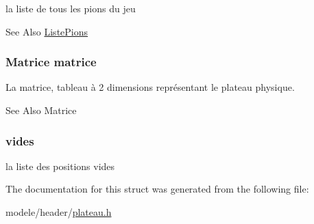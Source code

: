 la liste de tous les pions du jeu 

\begin{DoxySeeAlso}{See Also}
\hyperlink{struct_liste_pions}{Liste\-Pions} 
\end{DoxySeeAlso}
\hypertarget{struct_plateau_a5f45fe22d523ebf6b9fb3f9f154b4fdd}{
\subsubsection[{matrice}]{\setlength{\rightskip}{0pt plus 5cm}Matrice matrice}}\label{struct_plateau_a5f45fe22d523ebf6b9fb3f9f154b4fdd}


La matrice, tableau à 2 dimensions représentant le plateau physique. 

\begin{DoxySeeAlso}{See Also}
Matrice 
\end{DoxySeeAlso}
\hypertarget{struct_plateau_a59c898edd92cfc770d4a27b3648cc710}{
\subsubsection[{vides}]{ vides}}\label{struct_plateau_a59c898edd92cfc770d4a27b3648cc710}


la liste des positions vides 



The documentation for this struct was generated from the following file\-:\begin{DoxyCompactItemize}
\item 
modele/header/\hyperlink{plateau_8h}{plateau.\-h}\end{DoxyCompactItemize}
